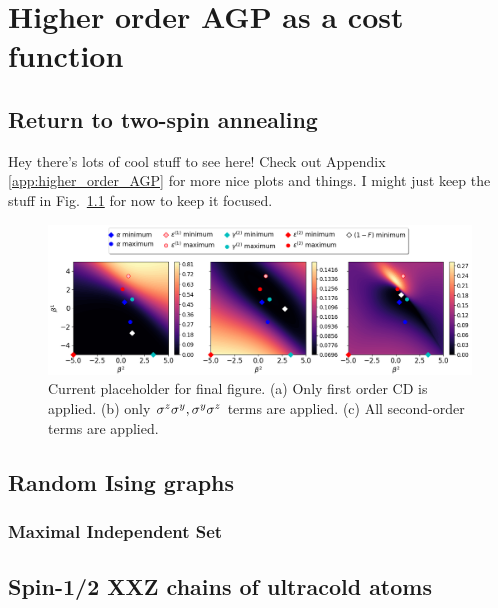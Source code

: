\chapter{Higher order AGP as a cost function}

\section{Return to two-spin annealing}

Hey there's lots of cool stuff to see here! Check out Appendix \ref{app:higher_order_AGP} for more nice plots and things. I might just keep the stuff in Fig.~\ref{fig:two_spin_higher_order} for now to keep it focused.

\begin{figure}[h]
    \centering
    \includegraphics[width=\linewidth]{images/2spin_Integrals_scaled_by_norm_final.png} \caption{Current placeholder for final figure. (a) Only first order CD is applied. (b) only $\sigma^z\sigma^y, \sigma^y\sigma^z$ terms are applied. (c) All second-order terms are applied.}\label{fig:two_spin_higher_order}
    \end{figure}

\section{Random Ising graphs}

\subsection{Maximal Independent Set}

\section{Spin-1/2 XXZ chains of ultracold atoms}